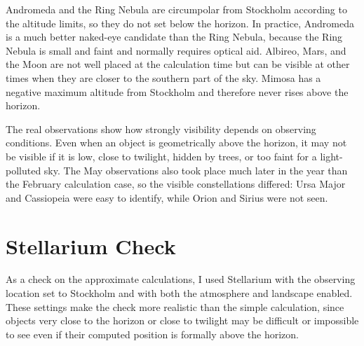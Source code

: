 \documentclass[a4paper,11pt]{article}
\begin{document}
Andromeda and the Ring Nebula are circumpolar from Stockholm according to the altitude limits, so they do not set below the horizon. In practice, Andromeda is a much better naked-eye candidate than the Ring Nebula, because the Ring Nebula is small and faint and normally requires optical aid. Albireo, Mars, and the Moon are not well placed at the calculation time but can be visible at other times when they are closer to the southern part of the sky. Mimosa has a negative maximum altitude from Stockholm and therefore never rises above the horizon.

The real observations show how strongly visibility depends on observing conditions. Even when an object is geometrically above the horizon, it may not be visible if it is low, close to twilight, hidden by trees, or too faint for a light-polluted sky. The May observations also took place much later in the year than the February calculation case, so the visible constellations differed: Ursa Major and Cassiopeia were easy to identify, while Orion and Sirius were not seen.

\section{Stellarium Check}
\label{sec:stellarium}

As a check on the approximate calculations, I used Stellarium with the observing location set to Stockholm and with both the atmosphere and landscape enabled. These settings make the check more realistic than the simple calculation, since objects very close to the horizon or close to twilight may be difficult or impossible to see even if their computed position is formally above the horizon.
\end{document}
